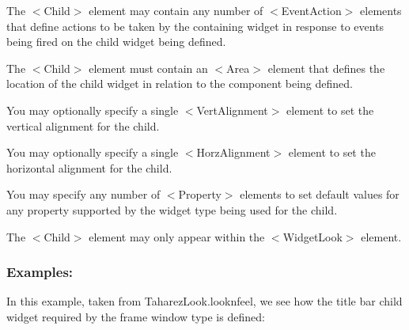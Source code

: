 \begin{DoxyItemize}
\item The {\ttfamily $<$Child$>$} element may contain any number of {\ttfamily $<$Event\+Action$>$} elements that define actions to be taken by the containing widget in response to events being fired on the child widget being defined. 
\item The {\ttfamily $<$Child$>$} element must contain an {\ttfamily $<$Area$>$} element that defines the location of the child widget in relation to the component being defined. 
\item You may optionally specify a single {\ttfamily $<$Vert\+Alignment$>$} element to set the vertical alignment for the child. 
\item You may optionally specify a single {\ttfamily $<$Horz\+Alignment$>$} element to set the horizontal alignment for the child. 
\item You may specify any number of {\ttfamily $<$Property$>$} elements to set default values for any property supported by the widget type being used for the child. 
\item The {\ttfamily $<$Child$>$} element may only appear within the {\ttfamily $<$Widget\+Look$>$} element. 
\end{DoxyItemize}\hypertarget{fal_element_ref_fal_elem_ref_sec_5_4}{}\subsubsection{Examples\+:}\label{fal_element_ref_fal_elem_ref_sec_5_4}
In this example, taken from Taharez\+Look.\+looknfeel, we see how the title bar child widget required by the frame window type is defined\+: 
\begin{DoxyCode}{0}
\end{DoxyCode}
